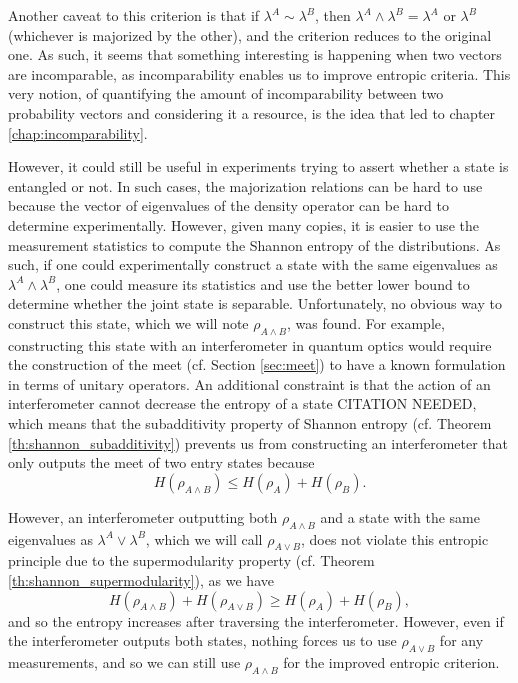 Another caveat to this criterion is that if $\lambda^A \sim \lambda^B$, then $\lambda^A \wedge \lambda^B = \lambda^A$ or $\lambda^B$ (whichever is majorized by the other), and the criterion reduces to the original one. As such, it seems that something interesting is happening when two vectors are incomparable, as incomparability enables us to improve entropic criteria. This very notion, of quantifying the amount of incomparability between two probability vectors and considering it a resource, is the idea that led to chapter \ref{chap:incomparability}.

However, it could still be useful in experiments trying to assert whether a state is entangled or not. In such cases, the majorization relations can be hard to use because the vector of eigenvalues of the density operator can be hard to determine experimentally. However, given many copies, it is easier to use the measurement statistics to compute the Shannon entropy of the distributions. As such, if one could experimentally construct a state with the same eigenvalues as $\lambda^A \wedge \lambda^B$, one could measure its statistics and use the better lower bound to determine whether the joint state is separable. Unfortunately, no obvious way to construct this state, which we will note $\rho_{A \wedge B}$, was found. For example, constructing this state with an interferometer in quantum optics would require the construction of the meet (cf. Section \ref{sec:meet}) to have a known formulation in terms of unitary operators. An additional constraint is that the action of an interferometer cannot decrease the entropy of a state CITATION NEEDED, which means that the subadditivity property of Shannon entropy (cf. Theorem \ref{th:shannon_subadditivity}) prevents us from constructing an interferometer that only outputs the meet of two entry states because
\begin{equation}
    H(\rho_{A \wedge B}) \leq H(\rho_A) + H(\rho_B).
\end{equation}

However, an interferometer outputting both $\rho_{A \wedge B}$ and a state with the same eigenvalues as $\lambda^A \vee \lambda^B$, which we will call $\rho_{A \vee B}$, does not violate this entropic principle due to the supermodularity property (cf. Theorem \ref{th:shannon_supermodularity}), as we have
\begin{equation}
    H(\rho_{A \wedge B}) + H(\rho_{A \vee B}) \geq H(\rho_A) + H(\rho_B),
\end{equation}
\noindent and so the entropy increases after traversing the interferometer. However, even if the interferometer outputs both states, nothing forces us to use $\rho_{A \vee B}$ for any measurements, and so we can still use $\rho_{A \wedge B}$ for the improved entropic criterion.

